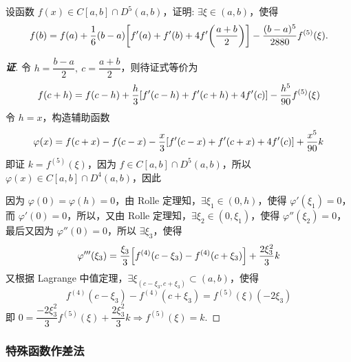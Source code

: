 \begin{example}
    设函数 $\displaystyle f(x)\in C[a,b]\cap D^5(a,b)$，证明: $\exists\xi\in(a,b)$，使得
    $$f(b)=f(a)+\dfrac{1}{6}(b-a)\qty[f'(a)+f'(b)+4f'\qty(\dfrac{a+b}{2})]-\dfrac{(b-a)^5}{2880}f^{(5)}(\xi).$$
\end{example}
\begin{proof}[{\songti \textbf{证}}]
    令 $h=\dfrac{b-a}{2},~c=\dfrac{a+b}{2}$，则待证式等价为
    $$f(c+h)=f(c-h)+\dfrac{h}{3}\qty[f'(c-h)+f'(c+h)+4f'(c)]-\dfrac{h^5}{90}f^{(5)}(\xi)$$
    令 $h=x$，构造辅助函数 $$\varphi(x)=f(c+x)-f(c-x)-\dfrac{x}{3}\qty[f'(c-x)+f'(c+x)+4f'(c)]+\dfrac{x^5}{90}k$$
    即证 $k=f^{(5)}(\xi)$，因为 $f\in C[a,b]\cap D^5(a,b)$，所以 $\varphi(x)\in C[a,b]\cap D^4(a,b)$，因此
    因为 $\varphi(0)=\varphi(h)=0$，由 Rolle 定理知，$\exists\xi_1\in(0,h)$，使得 $\varphi'(\xi_1)=0$，而 $\varphi'(0)=0$，所以，又由 Rolle 定理知，$\exists\xi_2\in(0,\xi_1)$，使得 $\varphi''(\xi_2)=0$，最后又因为 $\varphi''(0)=0$，所以 $\exists\xi_3$，使得
    $$\varphi'''(\xi_3)=\dfrac{\xi_3}{3}\qty[f^{(4)}(c-\xi_3)-f^{(4)}(c+\xi_3)]+\dfrac{2\xi_3^2}{3}k$$
    又根据 Lagrange 中值定理，$\exists\xi_(c-\xi_3,c+\xi_3)\subset(a,b)$，使得 $$f^{(4)}(c-\xi_3)-f^{(4)}(c+\xi_3)=f^{(5)}(\xi)(-2\xi_3)$$
    即 $0=\dfrac{-2\xi_3^2}{3}f^{(5)}(\xi)+\dfrac{2\xi_3^2}{3}k\Rightarrow f^{(5)}(\xi)=k$.
\end{proof}

\subsubsection{特殊函数作差法}

